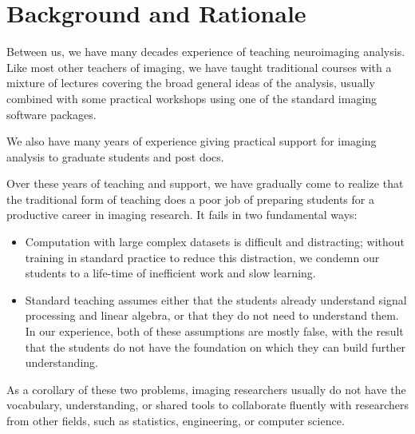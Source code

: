 
\section{Background and Rationale}\label{background}

Between us, we have many decades experience of teaching neuroimaging analysis.
Like most other teachers of imaging, we have taught traditional courses with a
mixture of lectures covering the broad general ideas of the analysis, usually
combined with some practical workshops using one of the standard imaging
software packages.

We also have many years of experience giving practical support for imaging
analysis to graduate students and post docs.

Over these years of teaching and support, we have gradually come to realize
that the traditional form of teaching does a poor job of preparing
students for a productive career in imaging research.  It fails in two
fundamental ways:

\begin{itemize}

\item
    Computation with large complex datasets is difficult and distracting;
        without training in standard practice to reduce this distraction, we
        condemn our students to a life-time of inefficient work and slow
        learning.

\item
    Standard teaching assumes either that the students already understand
        signal processing and linear algebra, or that they do not need to
        understand them.  In our experience, both of these assumptions are
        mostly false, with the result that the students do not have the
        foundation on which they can build further understanding.

\end{itemize}

As a corollary of these two problems, imaging researchers usually do not have
the vocabulary, understanding, or shared tools to collaborate fluently with
researchers from other fields, such as statistics, engineering, or computer
science.


